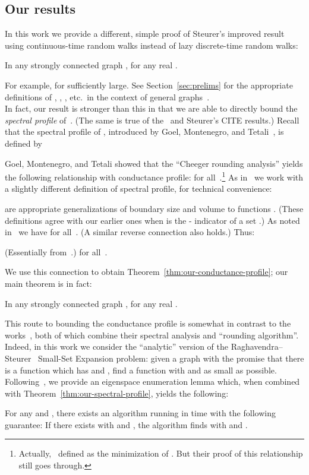\documentclass[11pt]{article}
\begin{document}
{\subsection{Our results}
In this work we provide a different, simple proof of Steurer's improved result using continuous-time random walks instead of lazy discrete-time random walks:
\begin{theorem} \label{thm:our-conductance-profile}
    In any strongly connected graph ,  for any real .
\end{theorem}
\noindent For example,  for  sufficiently large.  See Section~\ref{sec:prelims} for the appropriate definitions of , , , etc.\ in the context of general graphs~.\\

In fact, our result is stronger than this in that we are able to directly bound the \emph{spectral profile} of~.  (The same is true of the~\cite{ABS10} and Steurer's CITE results.)  Recall that the spectral profile  of , introduced by Goel, Montenegro, and Tetali~\cite{GMT06}, is defined by

Goel, Montenegro, and Tetali showed that the ``Cheeger rounding analysis'' yields the following relationship with conductance profile:  for all~.\footnote{Actually,~\cite{GMT06} defined  as the minimization of . But their proof of this relationship still goes through.} As in~\cite{ABS10} we work with a slightly different definition of spectral profile, for technical convenience:

are appropriate generalizations of boundary size and volume to functions .  (These definitions agree with our earlier ones when  is the - indicator of a set .)  As noted in~\cite[Lemma~A.2]{ABS10} we have  for all~.  (A similar reverse connection also holds.)  Thus:
\begin{theorem} \label{thm:GMT} (Essentially from~\cite{GMT06}.)  for all~.
\end{theorem}

We use this connection to obtain Theorem~\ref{thm:our-conductance-profile}; our main theorem is in fact:
\begin{theorem} \label{thm:our-spectral-profile}
    In any strongly connected graph ,  for any real .
\end{theorem}
This route to bounding the conductance profile is somewhat in contrast to the works~\cite{LRTV12,LOT12}, both of which combine their spectral analysis and ``rounding algorithm''.\\

Indeed, in this work we consider the ``analytic'' version of the Raghavendra--Steurer~\cite{RS10} Small-Set Expansion problem: given a graph  with the promise that there is a function  which has  and , find a function  with  and  as small as possible.  Following~\cite{ABS10}, we provide an eigenspace enumeration lemma which, when combined with Theorem~\ref{thm:our-spectral-profile}, yields the following:
\begin{theorem} \label{thm:our-alg}
    For any  and , there exists an algorithm running in time  with the following guarantee:  If there exists  with  and , the algorithm finds  with  and .
\end{theorem}

}
\end{document}
